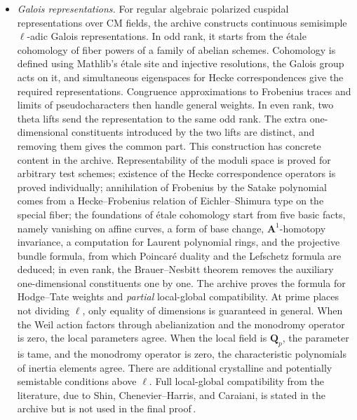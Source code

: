 \documentclass[11pt]{article}
\newcommand{\Q}{\mathbf{Q}}
\begin{document}
\begin{itemize}
\item \emph{Galois representations.} For regular algebraic polarized cuspidal representations over CM fields, the archive constructs continuous semisimple $\ell$-adic Galois representations. In odd rank, it starts from the étale cohomology of fiber powers of a family of abelian schemes. Cohomology is defined using Mathlib's étale site and injective resolutions, the Galois group acts on it, and simultaneous eigenspaces for Hecke correspondences give the required representations. Congruence approximations to Frobenius traces and limits of pseudocharacters then handle general weights. In even rank, two theta lifts send the representation to the same odd rank. The extra one-dimensional constituents introduced by the two lifts are distinct, and removing them gives the common part. This construction has concrete content in the archive. Representability of the moduli space is proved for arbitrary test schemes; existence of the Hecke correspondence operators is proved individually; annihilation of Frobenius by the Satake polynomial comes from a Hecke--Frobenius relation of Eichler--Shimura type on the special fiber; the foundations of étale cohomology start from five basic facts, namely vanishing on affine curves, a form of base change, $\mathbf A^1$-homotopy invariance, a computation for Laurent polynomial rings, and the projective bundle formula, from which Poincaré duality and the Lefschetz formula are deduced; in even rank, the Brauer--Nesbitt theorem removes the auxiliary one-dimensional constituents one by one. The archive proves the formula for Hodge--Tate weights and \emph{partial} local-global compatibility. At prime places not dividing $\ell$, only equality of dimensions is guaranteed in general. When the Weil action factors through abelianization and the monodromy operator is zero, the local parameters agree. When the local field is $\Q_p$, the parameter is tame, and the monodromy operator is zero, the characteristic polynomials of inertia elements agree. There are additional crystalline and potentially semistable conditions above $\ell$. Full local-global compatibility from the literature, due to Shin, Chenevier--Harris, and Caraiani, is stated in the archive but is not used in the final proof\,\cite{shin,ch,caraiani}.

\end{itemize}
\end{document}

